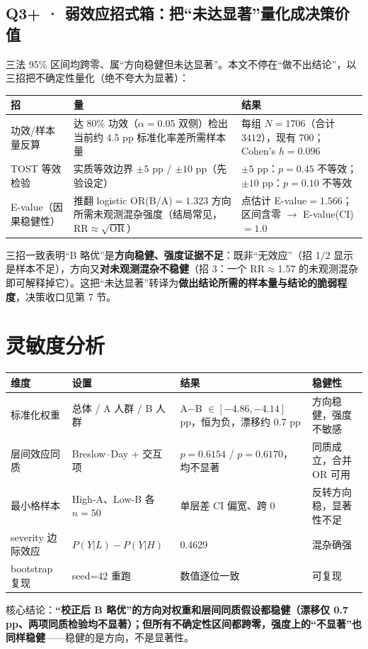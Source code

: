 \documentclass[12pt,a4paper]{ctexart}
\begin{document}
\subsection{Q3+ · 弱效应招式箱：把``未达显著''量化成决策价值}
三法 95\% 区间均跨零、属``方向稳健但未达显著''。本文不停在``做不出结论''，以三招把不确定性量化（绝不夸大为显著）：
\begin{center}
\begin{tabular}{p{3cm}p{6cm}p{4.5cm}}
\toprule
招 & 量 & 结果 \\
\midrule
功效/样本量反算 & 达 80\% 功效（$\alpha=0.05$ 双侧）检出当前约 4.5 pp 标准化率差所需样本量 & 每组 $N=1706$（合计 $3412$），现有 700；Cohen's $h=0.096$ \\
TOST 等效检验 & 实质等效边界 $\pm5$ pp / $\pm10$ pp（先验设定） & $\pm5$ pp：$p=0.45$ 不等效；$\pm10$ pp：$p=0.10$ 不等效 \\
E-value（因果稳健性） & 推翻 logistic OR(B/A)$=1.323$ 方向所需未观测混杂强度（结局常见，RR$\approx\sqrt{\text{OR}}$） & 点估计 E-value$=1.566$；区间含零 $\to$ E-value(CI)$=1.0$ \\
\bottomrule
\end{tabular}
\end{center}
三招一致表明``B 略优''是\textbf{方向稳健、强度证据不足}：既非``无效应''（招 1/2 显示是样本不足），方向又\textbf{对未观测混杂不稳健}（招 3：一个 RR$\approx$1.57 的未观测混杂即可解释掉它）。这把``未达显著''转译为\textbf{做出结论所需的样本量与结论的脆弱程度}，决策收口见第 7 节。

\section{灵敏度分析}
\begin{center}
\begin{tabular}{p{2.6cm}p{2.6cm}p{4.5cm}p{3cm}}
\toprule
维度 & 设置 & 结果 & 稳健性 \\
\midrule
标准化权重 & 总体 / A 人群 / B 人群 & A$-$B $\in[-4.86,-4.14]$ pp，恒为负，漂移约 0.7 pp & 方向稳健，强度不敏感 \\
层间效应同质 & Breslow--Day + 交互项 & $p=0.6154$ / $p=0.6170$，均不显著 & 同质成立，合并 OR 可用 \\
最小格样本 & High-A、Low-B 各 $n=50$ & 单层差 CI 偏宽、跨 0 & 反转方向稳，显著性不足 \\
severity 边际效应 & $P(Y|L)-P(Y|H)$ & 0.4629 & 混杂确强 \\
bootstrap 复现 & seed=42 重跑 & 数值逐位一致 & 可复现 \\
\bottomrule
\end{tabular}
\end{center}
核心结论：\textbf{``校正后 B 略优''的方向对权重和层间同质假设都稳健（漂移仅 0.7 pp、两项同质检验均不显著）；但所有不确定性区间都跨零，强度上的``不显著''也同样稳健}——稳健的是方向，不是显著性。
\end{document}
